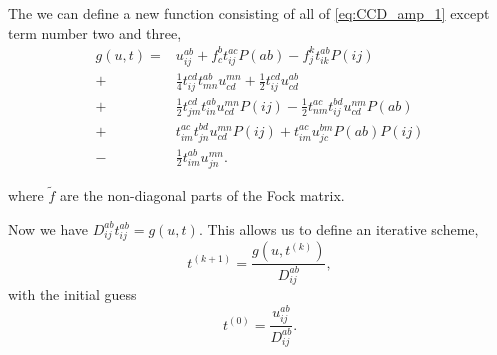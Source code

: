 \documentclass[
    a4paper, aps, twocolumn, floatfix, superscriptaddress,
    nofootinbib]{revtex4-1}
\newcommand{\1}{\mathds{1}}
\begin{document}
        The we can define a new function consisting of all of \autoref{eq:CCD_amp_1}
        except term number two and three,
        \begin{equation}
        \begin{aligned}
            g(u, t) =&
                    u^{ab}_{ij} + f^b_c t^{ac}_{ij}P(ab) - f^k_jt^{ab}_{ik}P(ij) \\
                 +& \frac{1}{4}t^{cd}_{ij} t^{ab}_{mn} u^{mn}_{cd} + \frac{1}{2}t^{cd}_{ij} u^{ab}_{cd} \\
                 +& \frac{1}{2}t^{cd}_{jm} t^{ab}_{in} u^{mn}_{cd} P(ij) - \frac{1}{2}t^{ac}_{nm} t^{bd}_{ij} u^{nm}_{cd} P(ab) \\
                 +& t^{ac}_{im} t^{bd}_{jn} u^{mn}_{cd} P(ij) + t^{ac}_{im} u^{bm}_{jc} P(ab) P(ij) \\
                 -& \frac{1}{2}t^{ab}_{im} u^{mn}_{jn}.
        \end{aligned}
        \end{equation}

        where $\tilde{f}$ are the non-diagonal parts of the Fock matrix.

        Now we have $D_{ij}^{ab}t_{ij}^{ab} = g(u, t)$.
        This allows us to define an iterative scheme,
        \begin{equation}
            t^{(k + 1)} = \frac{g(u, t^{(k)})}{D_{ij}^{ab}},
            \label{eq:iterative_amplitude}
        \end{equation}
        with the initial guess
        \begin{equation}
            t^{(0)} = \frac{u_{ij}^{ab}}{D_{ij}^{ab}}.
        \end{equation}
\end{document}
